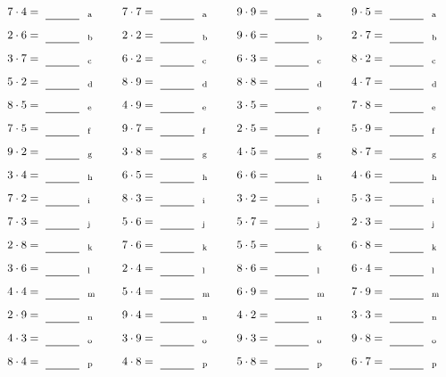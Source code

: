 \documentclass
[
  draft    = true,
  fontsize = 11pt,
  parskip  = half-
]
{scrartcl}
\begin{document}
\par\vfill\par
\begin{align*}
    \pline{7\cdot4}&=\rline{a}
  & \pline{7\cdot7}&=\rline{a}
  & \pline{9\cdot9}&=\rline{a}
  & \pline{9\cdot5}&=\rline{a} \\[1ex]
    \pline{2\cdot6}&=\rline{b}
  & \pline{2\cdot2}&=\rline{b}
  & \pline{9\cdot6}&=\rline{b}
  & \pline{2\cdot7}&=\rline{b} \\[1ex]
    \pline{3\cdot7}&=\rline{c}
  & \pline{6\cdot2}&=\rline{c}
  & \pline{6\cdot3}&=\rline{c}
  & \pline{8\cdot2}&=\rline{c} \\[1ex]
    \pline{5\cdot2}&=\rline{d}
  & \pline{8\cdot9}&=\rline{d}
  & \pline{8\cdot8}&=\rline{d}
  & \pline{4\cdot7}&=\rline{d} \\[1ex]
    \pline{8\cdot5}&=\rline{e}
  & \pline{4\cdot9}&=\rline{e}
  & \pline{3\cdot5}&=\rline{e}
  & \pline{7\cdot8}&=\rline{e} \\[1ex]
    \pline{7\cdot5}&=\rline{f}
  & \pline{9\cdot7}&=\rline{f}
  & \pline{2\cdot5}&=\rline{f}
  & \pline{5\cdot9}&=\rline{f} \\[1ex]
    \pline{9\cdot2}&=\rline{g}
  & \pline{3\cdot8}&=\rline{g}
  & \pline{4\cdot5}&=\rline{g}
  & \pline{8\cdot7}&=\rline{g} \\[1ex]
    \pline{3\cdot4}&=\rline{h}
  & \pline{6\cdot5}&=\rline{h}
  & \pline{6\cdot6}&=\rline{h}
  & \pline{4\cdot6}&=\rline{h} \\[1ex]
    \pline{7\cdot2}&=\rline{i}
  & \pline{8\cdot3}&=\rline{i}
  & \pline{3\cdot2}&=\rline{i}
  & \pline{5\cdot3}&=\rline{i} \\[1ex]
    \pline{7\cdot3}&=\rline{j}
  & \pline{5\cdot6}&=\rline{j}
  & \pline{5\cdot7}&=\rline{j}
  & \pline{2\cdot3}&=\rline{j} \\[1ex]
    \pline{2\cdot8}&=\rline{k}
  & \pline{7\cdot6}&=\rline{k}
  & \pline{5\cdot5}&=\rline{k}
  & \pline{6\cdot8}&=\rline{k} \\[1ex]
    \pline{3\cdot6}&=\rline{l}
  & \pline{2\cdot4}&=\rline{l}
  & \pline{8\cdot6}&=\rline{l}
  & \pline{6\cdot4}&=\rline{l} \\[1ex]
    \pline{4\cdot4}&=\rline{m}
  & \pline{5\cdot4}&=\rline{m}
  & \pline{6\cdot9}&=\rline{m}
  & \pline{7\cdot9}&=\rline{m} \\[1ex]
    \pline{2\cdot9}&=\rline{n}
  & \pline{9\cdot4}&=\rline{n}
  & \pline{4\cdot2}&=\rline{n}
  & \pline{3\cdot3}&=\rline{n} \\[1ex]
    \pline{4\cdot3}&=\rline{o}
  & \pline{3\cdot9}&=\rline{o}
  & \pline{9\cdot3}&=\rline{o}
  & \pline{9\cdot8}&=\rline{o} \\[1ex]
    \pline{8\cdot4}&=\rline{p}
  & \pline{4\cdot8}&=\rline{p}
  & \pline{5\cdot8}&=\rline{p}
  & \pline{6\cdot7}&=\rline{p}
\end{align*}
\end{document}
